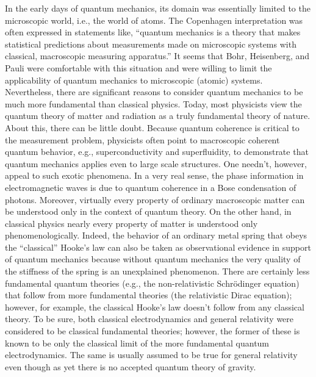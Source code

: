 \documentclass [12pt]{revtex4}
\begin{document}
In the early days of quantum mechanics, its domain was essentially
limited to the microscopic world, i.e., the world of atoms. The
Copenhagen interpretation was often expressed in statements like,
``quantum mechanics is a theory that makes statistical predictions
about measurements made on microscopic systems with classical,
macroscopic measuring apparatus.'' It seems that Bohr, Heisenberg,
and Pauli were comfortable with this situation and were willing to
limit the applicability of quantum mechanics to microscopic (atomic)
systems. Nevertheless, there are significant reasons to consider
quantum mechanics to be much more fundamental than classical
physics. Today, most physicists view the quantum theory of matter
and radiation as a truly {fundamental} theory of nature.
About this, there can be little doubt. Because quantum coherence
is critical to the measurement problem, physicists often point to
macroscopic coherent quantum behavior, e.g., superconductivity and
superfluidity, to demonstrate that quantum mechanics applies even to
large scale structures. One needn't, however, appeal to such exotic
phenomena. In a very real sense, the phase information in
electromagnetic waves is due to quantum coherence in a Bose
condensation of photons. Moreover, virtually every property of
ordinary macroscopic matter can be understood only in the context of
quantum theory. On the other hand, in classical physics nearly every
property of matter is understood only phenomenologically. Indeed,
the behavior of an ordinary metal spring that obeys the
``classical'' Hooke's law can also be taken as observational
evidence in support of quantum mechanics because without quantum
mechanics the very quality of the stiffness of the spring is an
unexplained phenomenon.  There are certainly less fundamental 
quantum theories (e.g.,
the non-relativistic Schr\"{o}dinger equation) that follow from
more fundamental theories (the relativistic Dirac equation); 
however, for example, the classical Hooke's law doesn't follow from
any classical theory.
To be sure, both classical electrodynamics and general relativity
were considered to be classical fundamental theories; however,
the former of these is known to be only the classical limit of
the more fundamental quantum electrodynamics.  The same is usually
assumed to be true for general relativity even though as yet there
is no accepted quantum theory of gravity.
\end{document}

